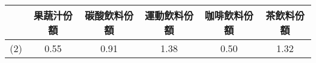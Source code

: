 \begin{tabular}{cccccc}
  \hline
 & 果蔬汁份額 & 碳酸飲料份額 & 運動飲料份額 & 咖啡飲料份額 & 茶飲料份額 \\ 
  \hline
(2) & 0.55 & 0.91 & 1.38 & 0.50 & 1.32 \\ 
   \hline
\end{tabular}
